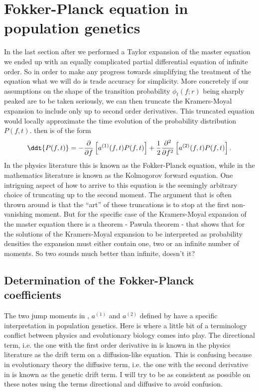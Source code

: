 \section{Fokker-Planck equation in population genetics}

In the last section after we performed a Taylor expansion of the master equation
we ended up with an equally complicated partial differential equation of
infinite order. So in order to make any progress towards simplifying the
treatment of the equation what we will do is trade accuracy for simplicity.
More concretely if our assumptions on the shape of the transition probability
$\phi_t(f; r)$ being sharply peaked are to be taken seriously, we can then
truncate the Kramers-Moyal expansion to include only up to second order
derivatives. This truncated equation would locally approximate the time
evolution of the probability distribution $P(f, t)$.  then
is of the form
\begin{equation}
  \ddt{P(f, t)} = - {\partial \over \partial f}
  \left[
  a^{(1)}(f, t) P(f, t)
  \right] +
  {1 \over 2}{\partial^2 \over \partial f^2}
  \left[
  a^{(2)}(f, t) P(f, t)
  \right].
  \label{eq_fokker_planck}
\end{equation}
In the physics literature this is known as the Fokker-Planck equation, while in
the mathematics literature is known as the Kolmogorov forward equation. One
intriguing aspect of how to arrive to this equation is the seemingly arbitrary
choice of truncating up to the second moment. The argument that is often thrown
around is that the ``art'' of these truncations is to stop at the first
non-vanishing moment. But for the specific case of the Kramers-Moyal expansion
of the master equation there is a theorem - Pawula theorem - that shows that for
the solutions of the Kramers-Moyal expansion to be interpreted as probability
densities the expansion must either contain one, two or an infinite number of
moments. So two sounds much better than infinite, doesn't it?

\subsection{Determination of the Fokker-Planck coefficients}

The two jump moments in , $a^{(1)}$ and $a^{(2)}$ defined
by  have a specific interpretation in population genetics.
Here is where a little bit of a terminology conflict between physics and
evolutionary biology comes into play. The directional term, i.e. the one with
the first order derivative in  is known in the physics
literature as the drift term on a diffusion-like equation. This is confusing
because in evolutionary theory the diffusive term, i.e. the one with the second
derivative in  is known as the genetic drift term. I will
try to be as consistent as possible on these notes using the terms directional
and diffusive to avoid confusion.

